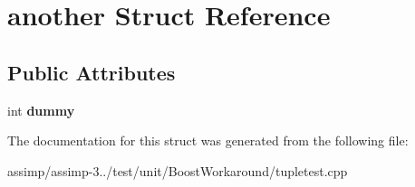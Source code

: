 \hypertarget{structanother}{\section{another Struct Reference}
\label{structanother}
}
\subsection*{Public Attributes}
\begin{DoxyCompactItemize}
\item 
\hypertarget{structanother_a396512927e3d3aac8c0527ae7bb41882}{int {\bfseries dummy}}\label{structanother_a396512927e3d3aac8c0527ae7bb41882}

\end{DoxyCompactItemize}


The documentation for this struct was generated from the following file\+:\begin{DoxyCompactItemize}
\item 
assimp/assimp-\/3../test/unit/\+Boost\+Workaround/tupletest.\+cpp\end{DoxyCompactItemize}

